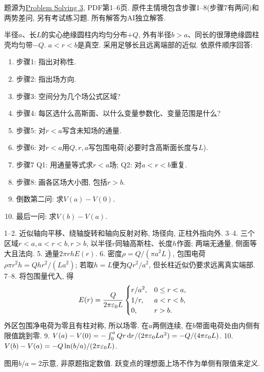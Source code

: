 题源为\href{https://ocw.mit.edu/courses/8-02-physics-ii-electricity-and-magnetism-spring-2007/resources/solving03/}{Problem Solving 3}, PDF第1--6页. 原件主情境包含步骤1--8(步骤7有两问)和两势差问, 另有考试练习题. 所有解答为AI独立解答.

\begin{exercise}
半径$a$、长$L$的实心绝缘圆柱内均匀分布$+Q$, 外有半径$b>a$、同长的很薄绝缘圆柱壳均匀带$-Q$. $a<r<b$是真空. 采用足够长且远离端部的近似. 依原件顺序回答:
\begin{enumerate}
\item 步骤1: 指出对称性.
\item 步骤2: 指出场方向.
\item 步骤3: 空间分为几个场公式区域?
\item 步骤4: 每区选什么高斯面、以什么变量参数化、变量范围是什么?
\item 步骤5: 对$r<a$写含未知场的通量.
\item 步骤6: 对$r<a$用$Q,r,a$写包围电荷(必要时含高斯面长度与$L$).
\item 步骤7 Q1: 用通量等式求$r<a$场; Q2: 对$a<r<b$重复.
\item 步骤8: 画各区场大小图, 包括$r>b$.
\item 倒数第二问: 求$V(a)-V(0)$.
\item 最后一问: 求$V(b)-V(a)$.
\end{enumerate}
\end{exercise}
\begin{solution}
1--2. 近似轴向平移、绕轴旋转和轴向反射对称, 场径向, 正柱外指向外.
3--4. 三个区域$r<a,a<r<b,r>b$, 以半径$r$同轴高斯柱、长度$h$作面; 两端无通量, 侧面等大且法向.
5. 通量$2\pi rhE(r)$.
6. 密度$\rho=Q/(\pi a^2L)$, 包围电荷$\rho\pi r^2h=Qhr^2/(La^2)$; 若取$h=L$便为$Qr^2/a^2$, 但长柱近似仍要求远离真实端部.
7--8. 将包围量代入, 得
\[
E(r)=\frac Q{2\pi\varepsilon_0 L}\begin{cases}r/a^2,&0\le r<a,\\1/r,&a<r<b,\\0,&r>b.\end{cases}
\]
外区包围净电荷为零且有柱对称, 所以场零. 在$a$两侧连续, 在$b$带面电荷处由内侧有限值跳到零.
9. $V(a)-V(0)=-\int_0^a Qr\,\mathrm d r/(2\pi\varepsilon_0 La^2)=-Q/(4\pi\varepsilon_0 L)$.
10. $V(b)-V(a)=-Q\ln(b/a)/(2\pi\varepsilon_0 L)$.
\begin{center}
\end{center}
图用$b/a=2$示意, 非原题指定数值. 跃变点的理想面上场不作为单侧有限值来定义.
\end{solution}

